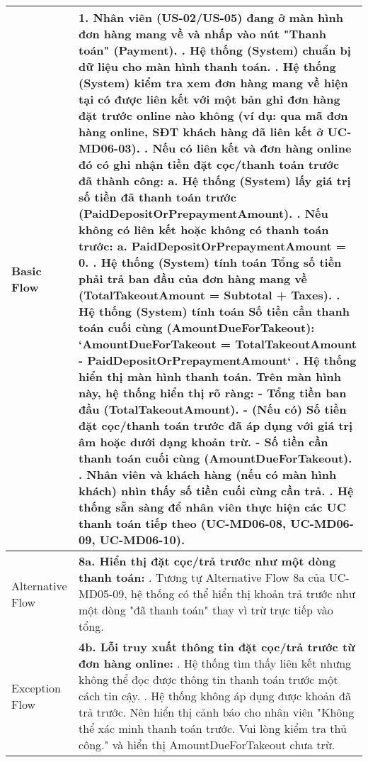 \begin{longtable}{|m{4cm}|p{11cm}|}
Basic Flow & 1. Nhân viên (US-02/US-05) đang ở màn hình đơn hàng mang về và nhấp vào nút "Thanh toán" (Payment). \newline 2. Hệ thống (System) chuẩn bị dữ liệu cho màn hình thanh toán. \newline 3. Hệ thống (System) kiểm tra xem đơn hàng mang về hiện tại có được liên kết với một bản ghi đơn hàng đặt trước online nào không (ví dụ: qua mã đơn hàng online, SĐT khách hàng đã liên kết ở UC-MD06-03). \newline 4. \textbf{Nếu có liên kết và đơn hàng online đó có ghi nhận tiền đặt cọc/thanh toán trước đã thành công:} \newline    a. Hệ thống (System) lấy giá trị số tiền đã thanh toán trước (PaidDepositOrPrepaymentAmount). \newline 5. \textbf{Nếu không có liên kết hoặc không có thanh toán trước:} \newline    a. PaidDepositOrPrepaymentAmount = 0. \newline 6. Hệ thống (System) tính toán Tổng số tiền phải trả ban đầu của đơn hàng mang về (TotalTakeoutAmount = Subtotal + Taxes). \newline 7. Hệ thống (System) tính toán Số tiền cần thanh toán cuối cùng (AmountDueForTakeout): \newline    `AmountDueForTakeout = TotalTakeoutAmount - PaidDepositOrPrepaymentAmount` \newline 8. Hệ thống hiển thị màn hình thanh toán. Trên màn hình này, hệ thống hiển thị rõ ràng: \newline    - Tổng tiền ban đầu (TotalTakeoutAmount). \newline    - (Nếu có) Số tiền đặt cọc/thanh toán trước đã áp dụng với giá trị âm hoặc dưới dạng khoản trừ. \newline    - Số tiền cần thanh toán cuối cùng (AmountDueForTakeout). \newline 9. Nhân viên và khách hàng (nếu có màn hình khách) nhìn thấy số tiền cuối cùng cần trả. \newline 10. Hệ thống sẵn sàng để nhân viên thực hiện các UC thanh toán tiếp theo (UC-MD06-08, UC-MD06-09, UC-MD06-10). \\
\hline
Alternative Flow & \textbf{8a. Hiển thị đặt cọc/trả trước như một dòng thanh toán:} \newline    1. Tương tự Alternative Flow 8a của UC-MD05-09, hệ thống có thể hiển thị khoản trả trước như một dòng "đã thanh toán" thay vì trừ trực tiếp vào tổng. \\
\hline
Exception Flow & \textbf{4b. Lỗi truy xuất thông tin đặt cọc/trả trước từ đơn hàng online:} \newline    1. Hệ thống tìm thấy liên kết nhưng không thể đọc được thông tin thanh toán trước một cách tin cậy. \newline    2. Hệ thống không áp dụng được khoản đã trả trước. Nên hiển thị cảnh báo cho nhân viên "Không thể xác minh thanh toán trước. Vui lòng kiểm tra thủ công." và hiển thị AmountDueForTakeout chưa trừ. \\

\end{longtable}
